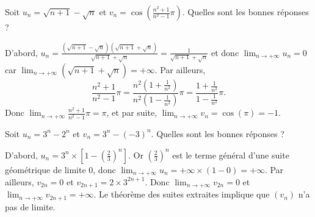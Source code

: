 \begin{question}

Soit $\displaystyle u_n=\sqrt{n+1}-\sqrt{n}$ et $\displaystyle v_n=\cos\left(\frac{n^2+1}{n^2-1}\pi\right)$. Quelles sont les bonnes réponses ?
\begin{answers}  
\end{answers}
\begin{explanations}
D'abord, $\displaystyle u_n=\frac{\left(\sqrt{n+1}-\sqrt{n}\right)\left(\sqrt{n+1}+\sqrt{n}\right)}{\sqrt{n+1}+\sqrt{n}}=\frac{1}{\sqrt{n+1}+\sqrt{n}}$ et donc $\displaystyle \lim _{n\to +\infty}u_n=0$ car $\displaystyle \lim _{n\to +\infty}\left(\sqrt{n+1}+\sqrt{n}\right)=+\infty$. Par ailleurs,
$$\displaystyle \frac{n^2+1}{n^2-1}\pi=\frac{n^2\left(1+\frac{1}{n^2}\right)}{n^2\left(1-\frac{1}{n^2}\right)}\pi=\frac{1+\frac{1}{n^2}}{1-\frac{1}{n^2}}\pi.$$
Donc $\displaystyle \lim _{n\to +\infty}\frac{n^2+1}{n^2-1}\pi=\pi$, et par suite, $\displaystyle \lim _{n\to +\infty}v_n=\cos (\pi)=-1$.
\end{explanations}
\end{question}




\begin{question}

Soit $\displaystyle u_n=3^n-2^n$ et $\displaystyle v_n=3^n-(-3)^n$. Quelles sont les bonnes réponses ?
\begin{answers}  
\end{answers}
\begin{explanations}
D'abord, $\displaystyle u_n=3^n\times \left[1-\left(\frac{2}{3}\right)^n\right]$. Or $\displaystyle \left(\frac{2}{3}\right)^n$ est le terme général d'une suite géométrique de limite $0$, donc $\displaystyle \lim _{n\to +\infty}u_n=+\infty\times (1-0)=+\infty$. Par ailleurs, $\displaystyle v_{2n}=0$ et $v_{2n+1}=2\times 3^{2n+1}$. Donc $\displaystyle \lim _{n\to +\infty}v_{2n}=0$ et $\displaystyle \lim _{n\to +\infty}v_{2n+1}=+\infty$. Le théorème des suites extraites implique que $(v_n)$ n'a pas de limite.
\end{explanations}
\end{question}




